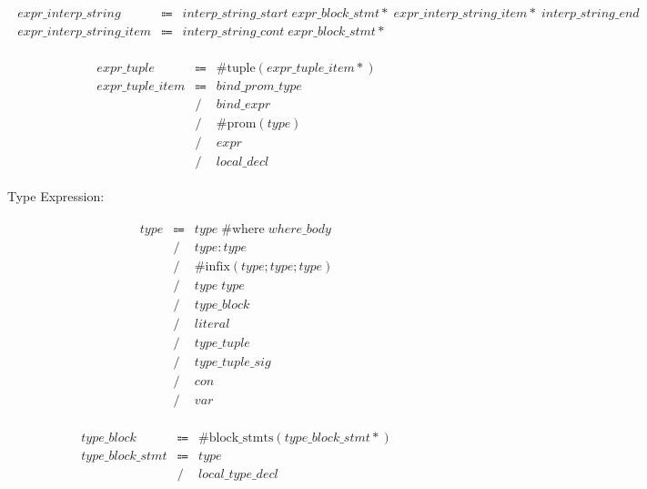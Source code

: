 \begin{align*}
    \begin{array}{rcll}
        \mathit{expr\_interp\_string}
        &\Coloneq &\mathit{interp\_string\_start}\; \mathit{expr\_block\_stmt}{*}\; \mathit{expr\_interp\_string\_item}{*}\; \mathit{interp\_string\_end} \\
        \mathit{expr\_interp\_string\_item}
        &\Coloneq &\mathit{interp\_string\_cont}\; \mathit{expr\_block\_stmt}{*}
    \end{array}
\end{align*}

\begin{align*}
    \begin{array}{rcll}
        \mathit{expr\_tuple}
        &\Coloneq &\mathrm{\#tuple}(\mathit{expr\_tuple\_item}*) \\
        \mathit{expr\_tuple\_item}
        &\Coloneq &\mathit{bind\_prom\_type} \\
        &\mathrel{/} &\mathit{bind\_expr} \\
        &\mathrel{/} &\mathrm{\#prom}(\mathit{type}) \\
        &\mathrel{/} &\mathit{expr} \\
        &\mathrel{/} &\mathit{local\_decl}
    \end{array}
\end{align*}

Type Expression:

\begin{align*}
    \begin{array}{rcll}
        \mathit{type}
        &\Coloneq &\mathit{type}\;\mathrm{\#where}\;\mathit{where\_body} \\
        &\mathrel{/} &\mathit{type}: \mathit{type} \\
        &\mathrel{/} &\mathrm{\#infix}(\mathit{type}; \mathit{type}; \mathit{type}) \\
        &\mathrel{/} &\mathit{type}\; \mathit{type} \\
        &\mathrel{/} &\mathit{type\_block} \\
        &\mathrel{/} &\mathit{literal} \\
        &\mathrel{/} &\mathit{type\_tuple} \\
        &\mathrel{/} &\mathit{type\_tuple\_sig} \\
        &\mathrel{/} &\mathit{con} \\
        &\mathrel{/} &\mathit{var}
    \end{array}
\end{align*}

\begin{align*}
    \begin{array}{rcll}
        \mathit{type\_block}
        &\Coloneq &\mathrm{\#block\_stmts}(\mathit{type\_block\_stmt}{*}) \\
        \mathit{type\_block\_stmt}
        &\Coloneq &\mathit{type} \\
        &\mathrel{/} &\mathit{local\_type\_decl}
    \end{array}
\end{align*}
